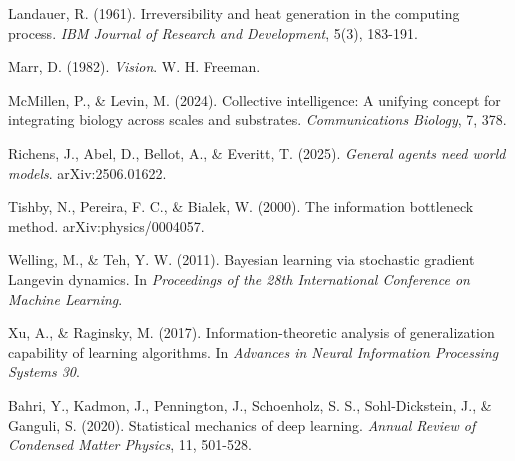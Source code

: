 \documentclass[11pt]{article}
\begin{document}
Landauer, R. (1961). Irreversibility and heat generation in the computing process. \textit{IBM Journal of Research and Development}, 5(3), 183-191.

Marr, D. (1982). \textit{Vision}. W. H. Freeman.

McMillen, P., \& Levin, M. (2024). Collective intelligence: A unifying concept for integrating biology across scales and substrates. \textit{Communications Biology}, 7, 378.

Richens, J., Abel, D., Bellot, A., \& Everitt, T. (2025). \textit{General agents need world models}. arXiv:2506.01622.

Tishby, N., Pereira, F. C., \& Bialek, W. (2000). The information bottleneck method. arXiv:physics/0004057.

Welling, M., \& Teh, Y. W. (2011). Bayesian learning via stochastic gradient Langevin dynamics. In \textit{Proceedings of the 28th International Conference on Machine Learning}.

Xu, A., \& Raginsky, M. (2017). Information-theoretic analysis of generalization capability of learning algorithms. In \textit{Advances in Neural Information Processing Systems 30}.

Bahri, Y., Kadmon, J., Pennington, J., Schoenholz, S. S., Sohl-Dickstein, J., \& Ganguli, S. (2020). Statistical mechanics of deep learning. \textit{Annual Review of Condensed Matter Physics}, 11, 501-528.
\end{document}
